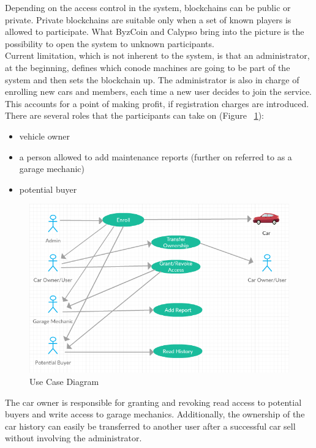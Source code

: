 Depending on the access control in the system, blockchains can be public or private. Private blockchains are suitable only when a set of known players is allowed to participate. What ByzCoin and Calypso bring into the picture is the possibility to open the system to unknown participants.\\
\newline
Current limitation, which is not inherent to the system, is that an administrator, at the beginning, defines which conode machines are going to be part of the system and then sets the blockchain up. The administrator is also in charge of enrolling new cars and members, each time a new user decides to join the service. This accounts for a point of making profit, if registration charges are introduced.
\newline
There are several roles that the participants can take on (Figure ~\ref{Use Case Diagram}):
\begin{itemize}
    \item vehicle owner
    \item a person allowed to add maintenance reports (further on referred to as a garage mechanic)
    \item potential buyer
\end{itemize}
\vspace{10pt}
\begin{figure}[H]
    \centering
    \includegraphics[width=1\textwidth]{Figures/use_case_diagram.png}
    \caption{Use Case Diagram}
    \label{Use Case Diagram}
\end{figure}
\vspace{10pt}
\noindent
The car owner is responsible for granting and revoking read access to potential buyers and write access to garage mechanics. Additionally, the ownership of the car history can easily be transferred to another user after a successful car sell without involving the administrator.\\ 
